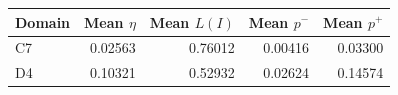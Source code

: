 \begin{tabular}{lrrrr}
\toprule
Domain & Mean $\eta$ & Mean $L(I)$ & Mean $p^-$ & Mean $p^+$ \\
\midrule
C7 & 0.02563 & 0.76012 & 0.00416 & 0.03300 \\
D4 & 0.10321 & 0.52932 & 0.02624 & 0.14574 \\
\bottomrule
\end{tabular}
